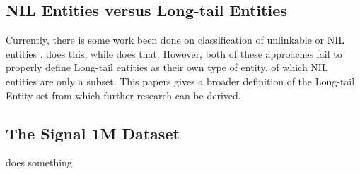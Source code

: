 \subsection{NIL Entities versus Long-tail Entities}
Currently, there is some work been done on classification of unlinkable or NIL entities \cite{someone}. \cite{someone} does this, while \cite{someone} does that. However, both of these approaches fail to properly define Long-tail entities as their own type of entity, of which NIL entities are only a subset. This papers gives a broader definition of the Long-tail Entity set from which further research can be derived. 

\subsection{The Signal 1M Dataset}
\cite{Signal1M2016} does something
